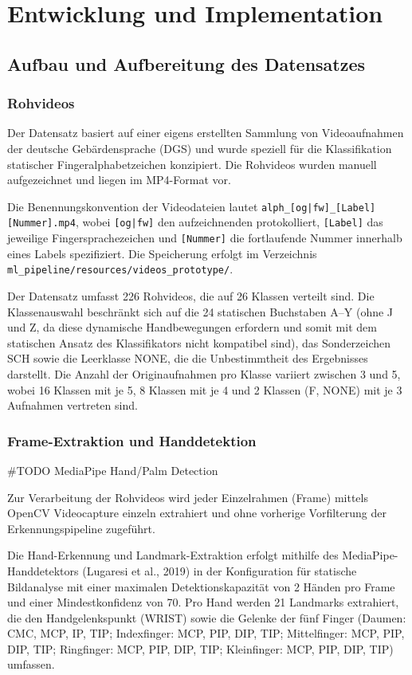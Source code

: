 \chapter{Entwicklung und Implementation}

\section{Aufbau und Aufbereitung des Datensatzes}
\subsection{Rohvideos}

Der Datensatz basiert auf einer eigens erstellten Sammlung von Videoaufnahmen der deutsche Gebärdensprache (DGS) und wurde speziell für die Klassifikation statischer Fingeralphabetzeichen konzipiert. Die Rohvideos wurden manuell aufgezeichnet und liegen im MP4-Format vor.

Die Benennungskonvention der Videodateien lautet \texttt{alph\_[og|fw]\_[Label][Nummer].mp4}, wobei \texttt{[og|fw]} den aufzeichnenden protokolliert, \texttt{[Label]} das jeweilige Fingersprachezeichen und \texttt{[Nummer]} die fortlaufende Nummer innerhalb eines Labels spezifiziert. Die Speicherung erfolgt im Verzeichnis \texttt{ml\_pipeline/resources/videos\_prototype/}.

Der Datensatz umfasst 226 Rohvideos, die auf 26 Klassen verteilt sind. Die Klassenauswahl beschränkt sich auf die 24 statischen Buchstaben A–Y (ohne J und Z, da diese dynamische Handbewegungen erfordern und somit mit dem statischen Ansatz des Klassifikators nicht kompatibel sind), das Sonderzeichen SCH sowie die Leerklasse NONE, die die Unbestimmtheit des Ergebnisses darstellt. Die Anzahl der Originaufnahmen pro Klasse variiert zwischen 3 und 5, wobei 16 Klassen mit je 5, 8 Klassen mit je 4 und 2 Klassen (F, NONE) mit je 3 Aufnahmen vertreten sind.

\subsection{Frame-Extraktion und Handdetektion}

\#TODO MediaPipe Hand/Palm Detection

Zur Verarbeitung der Rohvideos wird jeder Einzelrahmen (Frame) mittels OpenCV Videocapture einzeln extrahiert und ohne vorherige Vorfilterung der Erkennungspipeline zugeführt.

Die Hand-Erkennung und Landmark-Extraktion erfolgt mithilfe des MediaPipe-Handdetektors (Lugaresi et al., 2019) in der Konfiguration für statische Bildanalyse mit einer maximalen Detektionskapazität von 2 Händen pro Frame und einer Mindestkonfidenz von 70. Pro Hand werden 21 Landmarks extrahiert, die den Handgelenkspunkt (WRIST) sowie die Gelenke der fünf Finger (Daumen: CMC, MCP, IP, TIP; Indexfinger: MCP, PIP, DIP, TIP; Mittelfinger: MCP, PIP, DIP, TIP; Ringfinger: MCP, PIP, DIP, TIP; Kleinfinger: MCP, PIP, DIP, TIP) umfassen.


